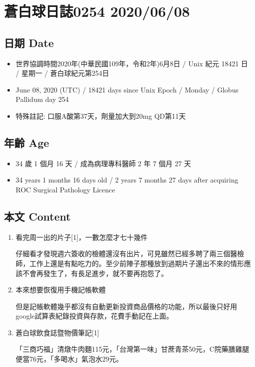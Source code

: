 \documentclass[a5paper, 11pt
]{book}
\providecommand{\tightlist}{%
  \setlength{\itemsep}{0pt}\setlength{\parskip}{0pt}}
\begin{document}
\hypertarget{ux84bcux767dux7403ux65e5ux8a8c0254-20200608}{%
\section{蒼白球日誌0254
2020/06/08}\label{ux84bcux767dux7403ux65e5ux8a8c0254-20200608}}

\hypertarget{ux65e5ux671f-date-7}{%
\subsection{日期 Date}\label{ux65e5ux671f-date-7}}

\begin{itemize}
\tightlist
\item
  世界協調時間2020年(中華民國109年，令和2年)6月8日 / Unix 紀元 18421 日
  / 星期一 / 蒼白球紀元第254日
\item
  June 08, 2020 (UTC) / 18421 days since Unix Epoch / Monday / Globus
  Pallidum day 254
\item
  特殊註記: 口服A酸第37天，劑量加大到20mg QD第11天
\end{itemize}

\hypertarget{ux5e74ux9f61-age-7}{%
\subsection{年齡 Age}\label{ux5e74ux9f61-age-7}}

\begin{itemize}
\tightlist
\item
  34 歲 1 個月 16 天 / 成為病理專科醫師 2 年 7 個月 27 天
\item
  34 years 1 months 16 days old / 2 years 7 months 27 days after
  acquiring ROC Surgical Pathology Licence
\end{itemize}

\hypertarget{ux672cux6587-content-7}{%
\subsection{本文 Content}\label{ux672cux6587-content-7}}

\begin{enumerate}
\def\labelenumi{\arabic{enumi}.}
\item
  看完周一出的片子{[}1{]}，一數怎麼才七十幾件

  仔細看才發現週六簽收的檢體還沒有出片，可見雖然已經多聘了兩三個醫檢師，工作上還是有點吃力的。至少前陣子那種放到過期片子還出不來的情形應該不會再發生了，有長足進步，就不要再抱怨了。
\item
  本來想要恢復用手機記帳軟體

  但是記帳軟體幾乎都沒有自動更新投資商品價格的功能，所以最後只好用google試算表紀錄投資與存款，花費手動記在上面。
\item
  蒼白球飲食誌暨物價筆記{[}1{]}

  「三商巧福」清燉牛肉麵115元，「台灣第一味」甘蔗青茶50元，C院藥膳雞腿便當76元，「多喝水」氣泡水29元。
\end{enumerate}
\end{document}
